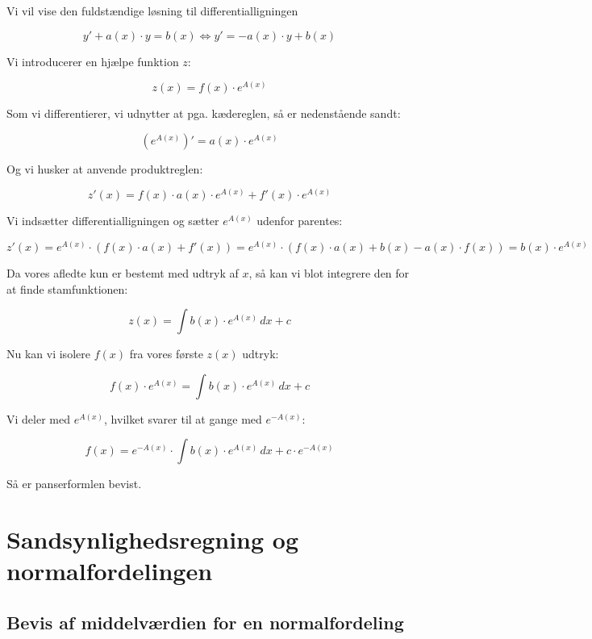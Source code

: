 \documentclass{article}
\makeatletter
\newenvironment{proofw}{\par
  \pushQED{\qed}%
  \normalfont \topsep6\p@\@plus6\p@\relax
  \trivlist
  \item[]\ignorespaces
}{%
  \popQED\endtrivlist\@endpefalse
}
\makeatother
\begin{document}
\begin{proofw}
    
Vi vil vise den fuldstændige løsning til differentialligningen

$$
    y'+a(x)\cdot y=b(x) \Leftrightarrow y'=-a(x) \cdot y + b(x) 
$$

Vi introducerer en hjælpe funktion $z$:

$$
    z(x)=f(x) \cdot e^{A(x)}
$$

Som vi differentierer, vi udnytter at pga. kædereglen,
så er nedenstående sandt:

$$
    \left(e^{A(x)}\right)'=a(x) \cdot e^{A(x)}
$$

Og vi husker at anvende produktreglen:

$$
    z'(x)=f(x) \cdot a(x) \cdot e^{A(x)}+f'(x)\cdot e^{A(x)}
$$

Vi indsætter differentialligningen og sætter $e^{A(x)}$ udenfor parentes:

$$
    z'(x)= e^{A(x)} \cdot (f(x) \cdot a(x) +f'(x))=
    e^{A(x)} \cdot (f(x) \cdot a(x) +b(x)-a(x)\cdot f(x))
    = b(x) \cdot e^{A(x)}
$$

Da vores afledte kun er bestemt med udtryk af $x$,
så kan vi blot integrere den for at finde stamfunktionen:

$$z(x)= \int b(x) \cdot e^{A(x)} \,dx+c$$

Nu kan vi isolere $f(x)$ fra vores første $z(x)$ udtryk:

$$
    f(x) \cdot e^{A(x)}=\int b(x) \cdot e^{A(x)} \,dx+c
$$

Vi deler med $e^{A(x)}$, hvilket svarer til at gange med $e^{-A(x)}$:

$$
    f(x)=e^{-A(x)} \cdot \int b(x) \cdot e^{A(x)} \,dx+c \cdot e^{-A(x)}
$$

Så er panserformlen bevist.

\end{proofw}

\section{Sandsynlighedsregning og normalfordelingen}

\subsection{Bevis af middelværdien for en normalfordeling}
\end{document}
